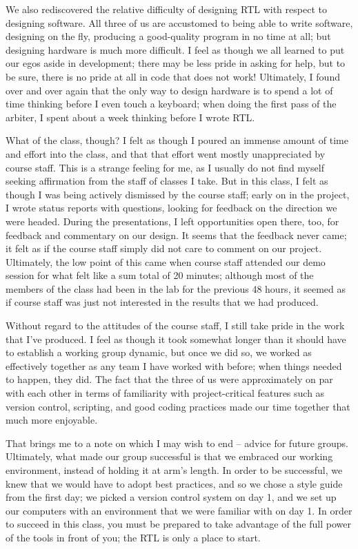 \documentclass[10pt]{report}
\begin{document}
We also rediscovered the relative difficulty of designing RTL with respect
to designing software.  All three of us are accustomed to being able to
write software, designing on the fly, producing a good-quality program in no
time at all; but designing hardware is much more difficult.  I feel as
though we all learned to put our egos aside in development; there may be
less pride in asking for help, but to be sure, there is no pride at all in
code that does not work!  Ultimately, I found over and over again that the
only way to design hardware is to spend a lot of time thinking before I even
touch a keyboard; when doing the first pass of the arbiter, I spent about a
week thinking before I wrote RTL.

What of the class, though?  I felt as though I poured an immense amount of
time and effort into the class, and that that effort went mostly
unappreciated by course staff.  This is a strange feeling for me, as I
usually do not find myself seeking affirmation from the staff of classes I
take.  But in this class, I felt as though I was being actively dismissed by
the course staff; early on in the project, I wrote status reports with
questions, looking for feedback on the direction we were headed.  During the
presentations, I left opportunities open there, too, for feedback and
commentary on our design.  It seems that the feedback never came; it felt as
if the course staff simply did not care to comment on our project. 
Ultimately, the low point of this came when course staff attended our demo
session for what felt like a sum total of 20 minutes; although most of the
members of the class had been in the lab for the previous 48 hours, it
seemed as if course staff was just not interested in the results that we had
produced.

Without regard to the attitudes of the course staff, I still take pride in
the work that I've produced.  I feel as though it took somewhat longer than
it should have to establish a working group dynamic, but once we did so, we
worked as effectively together as any team I have worked with before; when
things needed to happen, they did.  The fact that the three of us were
approximately on par with each other in terms of familiarity with
project-critical features such as version control, scripting, and good
coding practices made our time together that much more enjoyable.

That brings me to a note on which I may wish to end -- advice for future
groups.  Ultimately, what made our group successful is that we embraced our
working environment, instead of holding it at arm's length.  In order to be
successful, we knew that we would have to adopt best practices, and so we
chose a style guide from the first day; we picked a version control system
on day 1, and we set up our computers with an environment that we were
familiar with on day 1.  In order to succeed in this class, you must be
prepared to take advantage of the full power of the tools in front of you;
the RTL is only a place to start.
\end{document}
